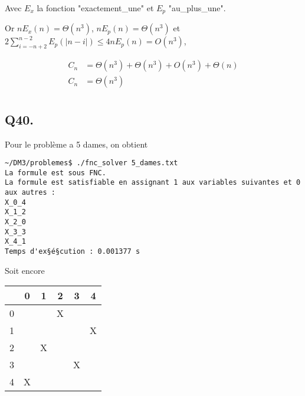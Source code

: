     Avec $E_x$ la fonction "exactement\_une" et $E_p$ "au\_plus\_une".
    
    Or $nE_x(n) = \Theta(n^3)$, $nE_p(n) = \Theta(n^3)$ et
    $2\sum_{i=-n+2}^{n-2}E_p(|n-i|) \leq 4nE_p(n) = O(n^3)$,
    
    \begin{align*}
        C_n &= \Theta(n^3) + \Theta(n^3) + O(n^3) +\Theta(n)\\
        C_n &= \boxed{\Theta(n^3)}\\
    \end{align*}
    
    \subsection*{Q40.}
    Pour le problème a 5 dames, on obtient
    \begin{lstlisting}
~/DM3/problemes$ ./fnc_solver 5_dames.txt 
La formule est sous FNC.
La formule est satisfiable en assignant 1 aux variables suivantes et 0 aux autres :
X_0_4
X_1_2
X_2_0
X_3_3
X_4_1
Temps d'ex§é§cution : 0.001377 s
    \end{lstlisting}
    Soit encore
    \begin{center}
        \begin{tabular}{| c || *{5}{c |}}
        \hline
          & 0 & 1 & 2 & 3 & 4 \\
        \hline
        \hline
        0 &   &   & X &   &   \\
        \hline
        1 &   &   &   &   & X \\
        \hline
        2 &   & X &   &   &   \\
        \hline
        3 &   &   &   & X &   \\
        \hline
        4 & X &   &   &   &   \\
        \hline
        \end{tabular}
    \end{center}
    
